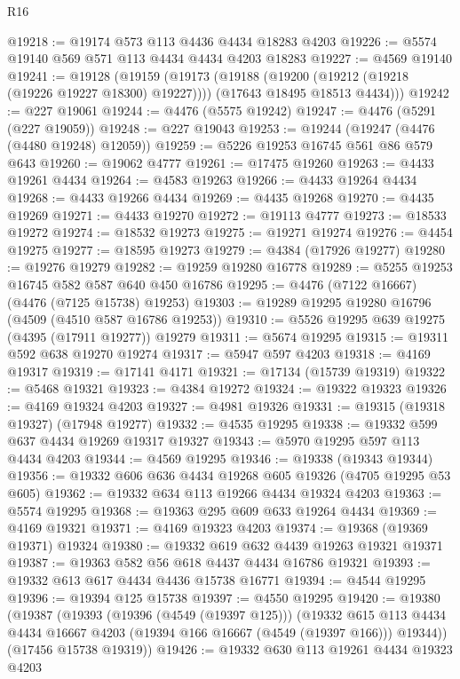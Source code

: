 \begin{lexlean}{R16}
\begin{coremodule}
@19218 := @19174 @573 @113 @4436 @4434 @18283 @4203
@19226 := @5574 @19140 @569 @571 @113 @4434 @4434 @4203 @18283
@19227 := @4569 @19140
@19241 := @19128
    (@19159
      (@19173
        (@19188 (@19200 (@19212 (@19218 (@19226 @19227 @18300) @19227))))
        (@17643 @18495 @18513 @4434)))
@19242 := @227 @19061
@19244 := @4476 (@5575 @19242)
@19247 := @4476 (@5291 (@227 @19059))
@19248 := @227 @19043
@19253 := @19244 (@19247 (@4476 (@4480 @19248) @12059))
@19259 := @5226 @19253 @16745 @561 @86 @579 @643
@19260 := @19062 @4777
@19261 := @17475 @19260
@19263 := @4433 @19261 @4434
@19264 := @4583 @19263
@19266 := @4433 @19264 @4434
@19268 := @4433 @19266 @4434
@19269 := @4435 @19268
@19270 := @4435 @19269
@19271 := @4433 @19270
@19272 := @19113 @4777
@19273 := @18533 @19272
@19274 := @18532 @19273
@19275 := @19271 @19274
@19276 := @4454 @19275
@19277 := @18595 @19273
@19279 := @4384 (@17926 @19277)
@19280 := @19276 @19279
@19282 := @19259 @19280 @16778
@19289 := @5255 @19253 @16745 @582 @587 @640 @450 @16786
@19295 := @4476 (@7122 @16667) (@4476 (@7125 @15738) @19253)
@19303 := @19289 @19295 @19280 @16796 (@4509 (@4510 @587 @16786 @19253))
@19310 := @5526 @19295 @639 @19275 (@4395 (@17911 @19277)) @19279
@19311 := @5674 @19295
@19315 := @19311 @592 @638 @19270 @19274
@19317 := @5947 @597 @4203
@19318 := @4169 @19317
@19319 := @17141 @4171
@19321 := @17134 (@15739 @19319)
@19322 := @5468 @19321
@19323 := @4384 @19272
@19324 := @19322 @19323
@19326 := @4169 @19324 @4203
@19327 := @4981 @19326
@19331 := @19315 (@19318 @19327) (@17948 @19277)
@19332 := @4535 @19295
@19338 := @19332 @599 @637 @4434 @19269 @19317 @19327
@19343 := @5970 @19295 @597 @113 @4434 @4203
@19344 := @4569 @19295
@19346 := @19338 (@19343 @19344)
@19356 := @19332 @606 @636 @4434 @19268 @605 @19326 (@4705 @19295 @53 @605)
@19362 := @19332 @634 @113 @19266 @4434 @19324 @4203
@19363 := @5574 @19295
@19368 := @19363 @295 @609 @633 @19264 @4434
@19369 := @4169 @19321
@19371 := @4169 @19323 @4203
@19374 := @19368 (@19369 @19371) @19324
@19380 := @19332 @619 @632 @4439 @19263 @19321 @19371
@19387 := @19363 @582 @56 @618 @4437 @4434 @16786 @19321
@19393 := @19332 @613 @617 @4434 @4436 @15738 @16771
@19394 := @4544 @19295
@19396 := @19394 @125 @15738
@19397 := @4550 @19295
@19420 := @19380
    (@19387
      (@19393
        (@19396 (@4549 (@19397 @125)))
        (@19332
          @615
          @113
          @4434
          @4434
          @16667
          @4203
          (@19394 @166 @16667 (@4549 (@19397 @166)))
          @19344))
      (@17456 @15738 @19319))
@19426 := @19332 @630 @113 @19261 @4434 @19323 @4203

\end{coremodule}
\end{lexlean}
